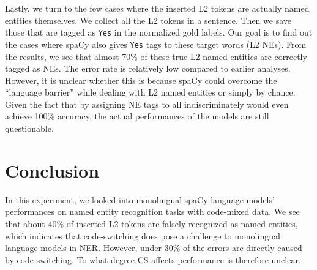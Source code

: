 \documentclass[11pt]{article}
\begin{document}
Lastly, we turn to the few cases where the inserted L2 tokens are actually named entities themselves. We collect all the L2 tokens in a sentence. Then we save those that are tagged as \texttt{Yes} in the normalized gold labels. Our goal is to find out the cases where spaCy also gives \texttt{Yes} tags to these target words (L2 NEs). From the results, we see that almost 70\% of these true L2 named entities are correctly tagged as NEs. The error rate is relatively low compared to earlier analyses. However, it is unclear whether this is because spaCy could overcome the ``language barrier'' while dealing with L2 named entities or simply by chance. Given the fact that by assigning NE tags to all indiscriminately would even achieve 100\% accuracy, the actual performances of the models are still questionable.


\section{Conclusion}

In this experiment, we looked into monolingual spaCy language models' performances on named entity recognition tasks with code-mixed data. We see that about 40\% of inserted L2 tokens are falsely recognized as named entities, which indicates that code-switching does pose a challenge to monolingual language models in NER. However, under 30\% of the errors are directly caused by code-switching. To what degree CS affects performance is therefore unclear.







%
\end{document}

